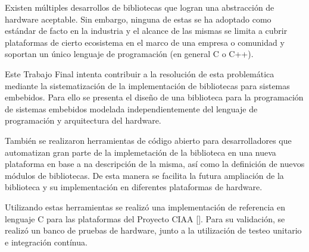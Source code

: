 Existen múltiples desarrollos de bibliotecas que logran una abstracción de hardware aceptable. Sin embargo, ninguna de estas se ha adoptado como estándar de facto en la industria y el alcance de las mismas se limita a cubrir plataformas de cierto ecosistema en el marco de una empresa o comunidad y soportan un único lenguaje de programación (en general C o C++).

Este Trabajo Final intenta contribuir a la resolución de esta problemática mediante la sistematización de la implementación de bibliotecas para sistemas embebidos. Para ello se presenta el diseño de una biblioteca para la programación de sistemas embebidos modelada independientemente del lenguaje de programación y arquitectura del hardware.

También se realizaron herramientas de código abierto para desarrolladores que automatizan gran parte de la implemetación de la biblioteca en una nueva plataforma en base a na descripción de la misma, así como la definición de nuevos módulos de bibliotecas. De esta manera se facilita la futura ampliación de la biblioteca y su implementación en diferentes plataformas de hardware.		

Utilizando estas herramientas se realizó una implementación de referencia en lenguaje C para las plataformas del Proyecto CIAA []. Para su validación, se realizó un banco de pruebas de hardware, junto a la utilización de testeo unitario e integración contínua.	
